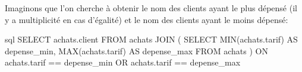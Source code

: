 \documentclass[a4paper]{scrartcl}
\begin{document}
			\exemple Imaginons que l'on cherche à obtenir le nom des clients ayant le plus dépensé (il y a multiplicité en cas d'égalité)
			et le nom des clients ayant le moins dépensé:

			\begin{code}{sql}
				SELECT achats.client
				FROM achats
				JOIN
				(
					SELECT MIN(achats.tarif) AS depense_min, MAX(achats.tarif) AS depense_max
					FROM achats
				)
				ON achats.tarif == depense_min OR achats.tarif == depense_max
			\end{code}
\end{document}
